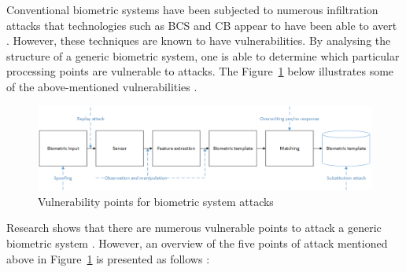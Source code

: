     Conventional biometric systems have been subjected to numerous infiltration attacks that technologies such as BCS and CB appear to have been able to avert \citep{Rathgeb2011}. However, these techniques are known to have vulnerabilities. By analysing the structure of a generic biometric system, one is able to determine which particular processing points are vulnerable to attacks. The Figure~\ref{fig:Vulnerability points for biometric system attacks} below illustrates some of the above-mentioned vulnerabilities \citep{Patel2015}.
    
    
    \begin{figure}[htbp!] 
    \centering    
    \includegraphics[width=1.0\textwidth]{Chapter2/Figs/Figure2-3.png}
    \caption[Vulnerability points for biometric system attacks]{Vulnerability points for biometric system attacks}
    \label{fig:Vulnerability points for biometric system attacks}
    \end{figure}
    
    Research shows that there are numerous vulnerable points to attack a generic biometric system \citep{Ratha2001}. However, an overview of the five points of attack mentioned above in Figure~\ref{fig:Vulnerability points for biometric system attacks} is presented as follows \citep{Karimovich2016, Patel2015, Ratha2001, Rathgeb2011}:
    
